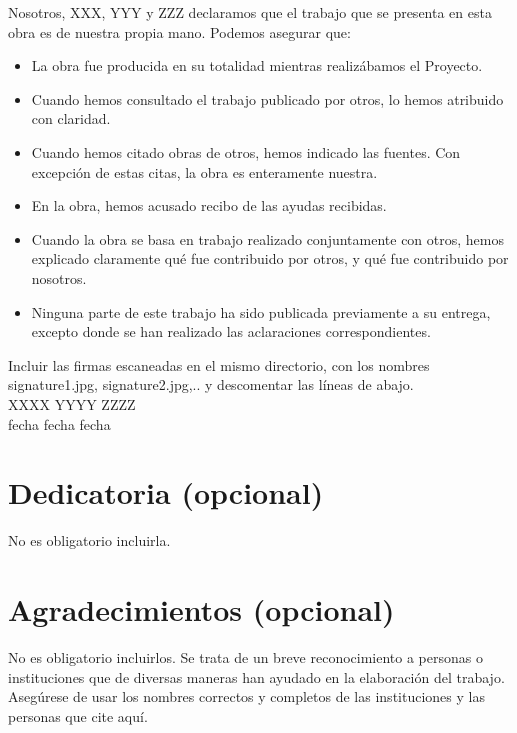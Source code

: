 \documentclass[12pt,a4paper,oneside]{book}
\begin{document}
Nosotros, XXX, YYY y ZZZ declaramos que el trabajo que se presenta en esta obra es de nuestra
propia mano. Podemos asegurar que:
\begin{itemize}
\item La obra fue producida en su totalidad mientras realizábamos el Proyecto.
\item Cuando hemos consultado el trabajo publicado por otros, lo hemos atribuido con claridad.
\item Cuando hemos citado obras de otros, hemos indicado las fuentes. Con excepción de estas citas, la obra es enteramente nuestra.
\item En la obra, hemos acusado recibo de las ayudas recibidas.
\item Cuando la obra se basa en trabajo realizado conjuntamente con otros, hemos explicado claramente qué fue contribuido por otros, y qué fue contribuido por nosotros.
\item Ninguna parte de este trabajo ha sido publicada previamente a su entrega, excepto donde se han realizado las aclaraciones correspondientes.
\end{itemize}

 
\vspace{2cm}


\noindent Incluir las firmas escaneadas en el mismo directorio, con los nombres signature1.jpg, signature2.jpg,.. y descomentar las líneas de abajo.\\


XXXX \hfill YYYY \hfill ZZZZ\\

fecha \hfill fecha \hfill fecha



\chapter*{Dedicatoria (opcional)}

No es obligatorio incluirla.



\chapter*{Agradecimientos (opcional)}
No es obligatorio incluirlos. Se trata de un breve reconocimiento a personas o instituciones que de diversas maneras han ayudado en la elaboración del trabajo. 
Asegúrese de usar los nombres correctos y completos de las instituciones y las personas que cite aquí.
\end{document}
